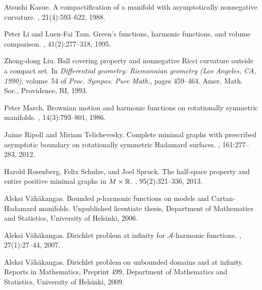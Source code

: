 \documentclass[10pt,a4paper,reqno]{amsart}
\numberwithin{equation}{section}
\theoremstyle{plain}
\theoremstyle{definition}
\begin{document}
\begin{thebibliography}{10}
Atsushi Kasue.
\newblock A compactification of a manifold with asymptotically nonnegative
  curvature.
, 21(4):593--622, 1988.

Peter Li and Luen-Fai Tam.
\newblock Green's functions, harmonic functions, and volume comparison.
, 41(2):277--318, 1995.

Zhong-dong Liu.
\newblock Ball covering property and nonnegative {R}icci curvature outside a
  compact set.
\newblock In {\em Differential geometry: {R}iemannian geometry ({L}os
  {A}ngeles, {CA}, 1990)}, volume~54 of {\em Proc. Sympos. Pure Math.}, pages
  459--464. Amer. Math. Soc., Providence, RI, 1993.

Peter March.
\newblock Brownian motion and harmonic functions on rotationally symmetric
  manifolds.
, 14(3):793--801, 1986.

Jaime Ripoll and Miriam Telichevesky.
\newblock Complete minimal graphs with prescribed asymptotic boundary on
  rotationally symmetric {H}adamard surfaces.
, 161:277--283, 2012.

Harold Rosenberg, Felix Schulze, and Joel Spruck.
\newblock The half-space property and entire positive minimal graphs in
  {$M\times\Bbb{R}$}.
, 95(2):321--336, 2013.

Aleksi V{\"a}h{\"a}kangas.
\newblock Bounded {$p$}-harmonic functions on models and {C}artan-{H}adamard
  manifolds.
\newblock Unpublished licentiate thesis, Department of Mathematics and
  Statistics, University of Helsinki, 2006.

Aleksi V{\"a}h{\"a}kangas.
\newblock Dirichlet problem at infinity for {${\mathcal A}$}-harmonic
  functions.
, 27(1):27--44, 2007.

Aleksi V{\"a}h{\"a}kangas.
\newblock Dirichlet problem on unbounded domains and at infinity.
\newblock Reports in {M}athematics, {P}reprint 499, Department of Mathematics
  and Statistics, University of Helsinki, 2009.

\end{thebibliography}
\end{document}
